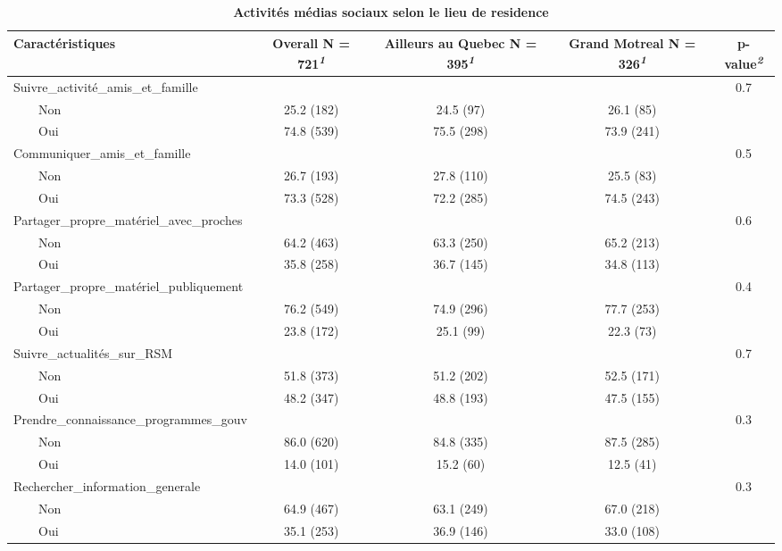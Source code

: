 \documentclass[
]{article}
\begin{document}
\newpage
\begin{table}[!t]
\caption{\label{tab:unnamed-chunk-13}\textbf{Activités médias sociaux selon le lieu de residence}} 
\fontsize{12.0pt}{14.4pt}\selectfont
\begin{tabular*}{\linewidth}{@{\extracolsep{\fill}}lcccc}
\toprule
\textbf{Caractéristiques} & \textbf{Overall}  N = 721\textsuperscript{\textit{1}} & \textbf{Ailleurs au Quebec}  N = 395\textsuperscript{\textit{1}} & \textbf{Grand Motreal}  N = 326\textsuperscript{\textit{1}} & \textbf{p-value}\textsuperscript{\textit{2}} \\ 
\midrule\addlinespace[2.5pt]
Suivre\_activité\_amis\_et\_famille &  &  &  & 0.7 \\ 
    Non & 25.2 (182) & 24.5 (97) & 26.1 (85) &  \\ 
    Oui & 74.8 (539) & 75.5 (298) & 73.9 (241) &  \\ 
Communiquer\_amis\_et\_famille &  &  &  & 0.5 \\ 
    Non & 26.7 (193) & 27.8 (110) & 25.5 (83) &  \\ 
    Oui & 73.3 (528) & 72.2 (285) & 74.5 (243) &  \\ 
Partager\_propre\_matériel\_avec\_proches &  &  &  & 0.6 \\ 
    Non & 64.2 (463) & 63.3 (250) & 65.2 (213) &  \\ 
    Oui & 35.8 (258) & 36.7 (145) & 34.8 (113) &  \\ 
Partager\_propre\_matériel\_publiquement &  &  &  & 0.4 \\ 
    Non & 76.2 (549) & 74.9 (296) & 77.7 (253) &  \\ 
    Oui & 23.8 (172) & 25.1 (99) & 22.3 (73) &  \\ 
Suivre\_actualités\_sur\_RSM &  &  &  & 0.7 \\ 
    Non & 51.8 (373) & 51.2 (202) & 52.5 (171) &  \\ 
    Oui & 48.2 (347) & 48.8 (193) & 47.5 (155) &  \\ 
Prendre\_connaissance\_programmes\_gouv &  &  &  & 0.3 \\ 
    Non & 86.0 (620) & 84.8 (335) & 87.5 (285) &  \\ 
    Oui & 14.0 (101) & 15.2 (60) & 12.5 (41) &  \\ 
Rechercher\_information\_generale &  &  &  & 0.3 \\ 
    Non & 64.9 (467) & 63.1 (249) & 67.0 (218) &  \\ 
    Oui & 35.1 (253) & 36.9 (146) & 33.0 (108) &  \\ 

\end{tabular*}
\end{table}
\end{document}

